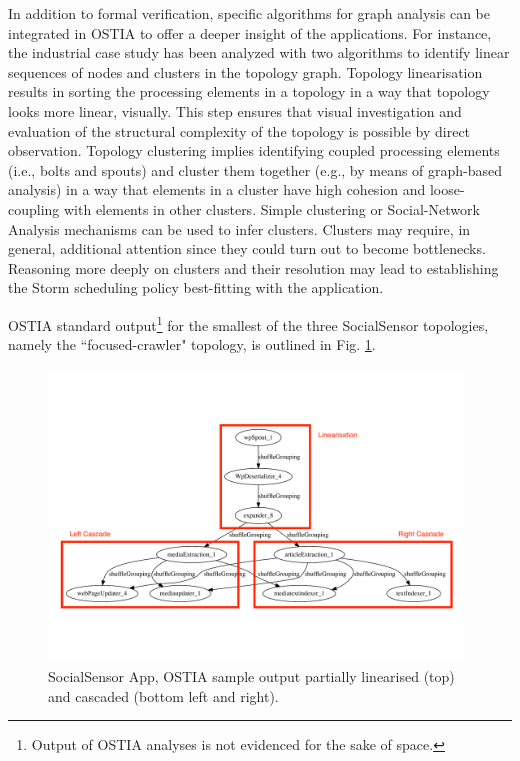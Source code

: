 In addition to formal verification, specific algorithms for graph analysis can be integrated in OSTIA to offer a deeper insight of the applications.
For instance, the industrial case study has been analyzed with two algorithms to identify linear sequences of nodes and clusters in the topology graph.
Topology linearisation results in sorting the processing elements in a topology in a way that topology looks more linear, visually. 
This step ensures that visual investigation and evaluation of the structural complexity of the topology is possible by direct observation. 
Topology clustering implies identifying coupled processing elements (i.e., bolts and spouts) and cluster them together (e.g., by means of graph-based analysis) in a way that elements in a cluster have high cohesion and loose-coupling with elements in other clusters. 
Simple clustering or Social-Network Analysis mechanisms can be used to infer clusters. 
Clusters may require, in general, additional attention since they could turn out to become bottlenecks. 
Reasoning more deeply on clusters and their resolution may lead to establishing the Storm scheduling policy best-fitting with the application.


OSTIA standard output\footnote{Output of OSTIA analyses is not evidenced for the
sake of space.} for the smallest of the three SocialSensor topologies, namely
the ``focused-crawler" topology, is outlined in Fig. \ref{topo1}.

\begin{figure}
\begin{center}
		\includegraphics[width=11cm]{images/output/focused_crawler}
		\caption{SocialSensor App, OSTIA sample output partially linearised (top) and cascaded (bottom left and right).}
		\label{topo1}
		\end{center}
\end{figure}



